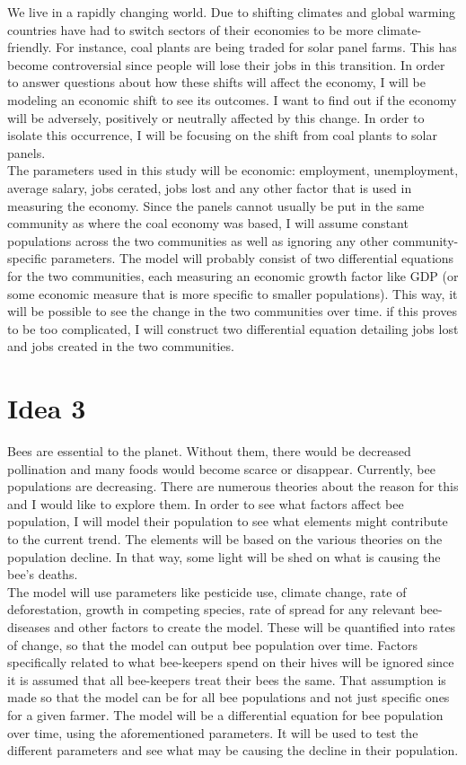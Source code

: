 \documentclass[12pt]{article}
\newcommand\tab[1][1cm]{\hspace*{#1}}
\begin{document}
	\tab We live in a rapidly changing world.  Due to shifting climates and global warming countries have had to switch sectors of their economies to be more climate-friendly.  For instance, coal plants are being traded for solar panel farms.  This has become controversial since people will lose their jobs in this transition.  In order to answer questions about how these shifts will affect the economy, I will be modeling an economic shift to see its outcomes.  I want to find out if the economy will be adversely, positively or neutrally affected by this change.  In order to isolate this occurrence, I will be focusing on the shift from coal plants to solar panels. \\
	\tab The parameters used in this study will be economic: employment, unemployment, average salary, jobs cerated, jobs lost and any other factor that is used in measuring the economy.  Since the panels cannot usually be put in the same community as where the coal economy was based, I will assume constant populations across the two communities as well as ignoring any other community-specific parameters.  The model will probably consist of two differential equations for the two communities, each measuring an economic growth factor like GDP (or some economic measure that is more specific to smaller populations).  This way, it will be possible to see the change in the two communities over time.  if this proves to be too complicated, I will construct two differential equation detailing jobs lost and jobs created in the two communities. \\
	
\section*{Idea 3}
	
    \tab Bees are essential to the planet.  Without them, there would be decreased pollination and many foods would become scarce or disappear.  Currently, bee populations are decreasing.  There are numerous theories about the reason for this and I would like to explore them.  In order to see what factors affect bee population, I will model their population to see what elements might contribute to the current trend.  The elements will be based on the various theories on the population decline.  In that way, some light will be shed on what is causing the bee's deaths.  \\
    \tab  The model will use parameters like pesticide use, climate change, rate of deforestation, growth in competing species, rate of spread for any relevant bee-diseases and other factors to create the model.  These will be quantified into rates of change, so that the model can output bee population over time. Factors specifically related to what bee-keepers spend on their hives will be ignored since it is assumed that all bee-keepers treat their bees the same.  That assumption is made so that the model can be for all bee populations and not just specific ones for a given farmer.  The model will be a differential equation for bee population over time, using the aforementioned parameters.  It will be used to test the different parameters and see what may be causing the decline in their population.     
\end{document}
